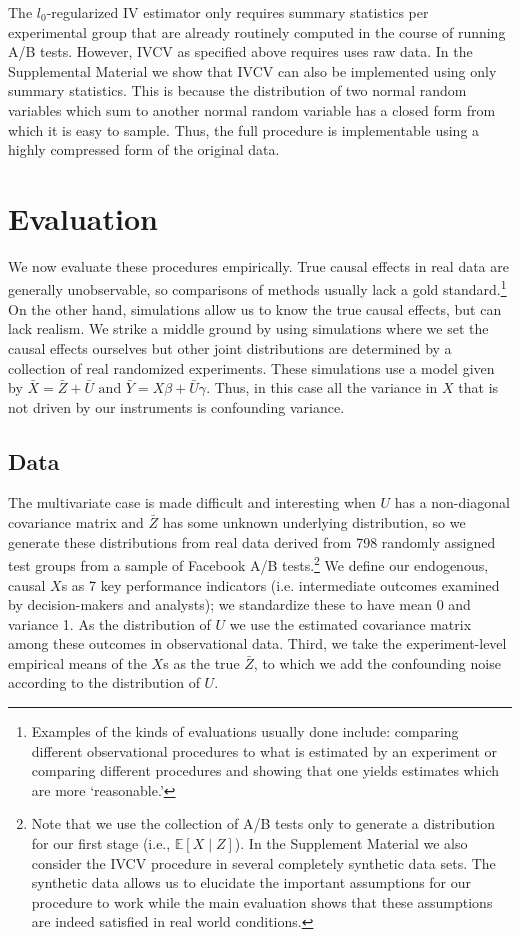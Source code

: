 \documentclass{article}
\newcommand\E{\mathbb{E}}
\begin{document}
The $l_0$-regularized IV estimator only requires summary statistics per experimental group that are already routinely computed in the course of running A/B tests. However, IVCV as specified above requires uses raw data. In the Supplemental Material we show that IVCV can also be implemented using only summary statistics. This is because the distribution of two normal random variables which sum to another normal random variable has a closed form from which it is easy to sample. Thus, the full procedure is implementable using a highly compressed form of the original data.

\section{Evaluation}
We now evaluate these procedures empirically. True causal effects in real data are generally unobservable, so comparisons of methods usually lack a gold standard.\footnote{Examples of the kinds of evaluations usually done include: comparing different observational procedures to what is estimated by an experiment or comparing different procedures and showing that one yields estimates which are more `reasonable.'} On the other hand, simulations allow us to know the true causal effects, but can lack realism. We strike a middle ground by using simulations where we set the causal effects ourselves but other joint distributions are determined by a collection of real randomized experiments. These simulations use a model given by $\bar{X} = \bar{Z} + \bar{U} \text{ and } \bar{Y} = X \beta + \bar{U} \gamma.$ Thus, in this case all the variance in $X$ that is not driven by our instruments is confounding variance.

\subsection{Data}
The multivariate case is made difficult and interesting when $U$ has a non-diagonal covariance matrix and $\bar{Z}$ has some unknown underlying distribution, so we generate these distributions from real data derived from 798 randomly assigned test groups from a sample of Facebook A/B tests.\footnote{Note that we use the collection of A/B tests only to generate a distribution for our first stage (i.e., $\E[X \mid Z]$). In the Supplement Material we also consider the IVCV procedure in several completely synthetic data sets. The synthetic data allows us to elucidate the important assumptions for our procedure to work while the main evaluation shows that these assumptions are indeed satisfied in real world conditions.} We define our endogenous, causal $X$s as 7 key performance indicators (i.e. intermediate outcomes examined by decision-makers and analysts); we standardize these to have mean 0 and variance 1. As the distribution of $U$ we use the estimated covariance matrix among these outcomes in observational data. Third, we take the experiment-level empirical means of the $X$s as the true $\bar{Z}$, to which we add the confounding noise according to the distribution of $U$.
\end{document}
